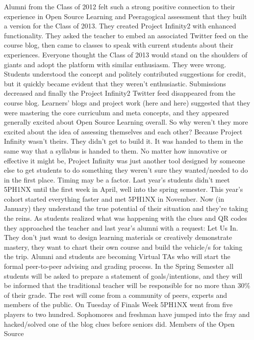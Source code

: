 Alumni from the Class of 2012 felt such a strong positive connection to
their experience in Open Source Learning and Peeragogical assessment
that they built a version for the Class of 2013. They created Project
Infinity2 with enhanced functionality. They asked the teacher to embed
an associated Twitter feed on the course blog, then came to classes to
speak with current students about their experiences. Everyone thought
the Class of 2013 would stand on the shoulders of giants and adopt the
platform with similar enthusiasm. They were wrong. Students understood
the concept and politely contributed suggestions for credit, but it
quickly became evident that they weren't enthusiastic. Submissions
decreased and finally the Project Infinity2 Twitter feed disappeared
from the course blog. Learners' blogs and project work (here and here)
suggested that they were mastering the core curriculum and meta
concepts, and they appeared generally excited about Open Source Learning
overall. So why weren't they more excited about the idea of assessing
themselves and each other? Because Project Infinity wasn't theirs. They
didn't get to build it. It was handed to them in the same way that a
syllabus is handed to them. No matter how innovative or effective it
might be, Project Infinity was just another tool designed by someone
else to get students to do something they weren't sure they
wanted/needed to do in the first place. Timing may be a factor. Last
year's students didn't meet 5PH1NX until the first week in April, well
into the spring semester. This year's cohort started everything faster
and met 5PH1NX in November. Now (in January) they understand the true
potential of their situation and they're taking the reins. As students
realized what was happening with the clues and QR codes they approached
the teacher and last year's alumni with a request: Let Us In. They don't
just want to design learning materials or creatively demonstrate
mastery, they want to chart their own course and build the vehicle/s for
taking the trip. Alumni and students are becoming Virtual TAs who will
start the formal peer-to-peer advising and grading process. In the
Spring Semester all students will be asked to prepare a statement of
goals/intentions, and they will be informed that the traditional teacher
will be responsible for no more than 30\% of their grade. The rest will
come from a community of peers, experts and members of the public. On
Tuesday of Finals Week 5PH1NX went from five players to two hundred.
Sophomores and freshman have jumped into the fray and hacked/solved one
of the blog clues before seniors did. Members of the Open Source
